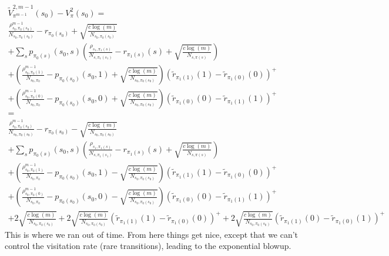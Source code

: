 \documentclass[11pt]{article}
\begin{document}
\begin{gather*}
\tilde{V}^{2, m-1}_{\pi^{m-1}}(s_0)-V_\pi^2(s_0) = \\
\frac{\rho^{m-1}_{s_0, \pi_0(s_0)}}{N_{s_0, \pi_0(s_0)}} - r_{\pi_0(s_0)} + \sqrt{\frac{c \log(m)}{N_{s_0, \pi_0(s_0)}}} \\
+ \sum_s p_{\pi_0(s)}(s_0, s) ( \frac{\rho_{s_1, \pi_1(s)}}{N_{s, \pi_1(s_1)}} - r_{\pi_1(s)}(s)+ \sqrt{\frac{c \log(m)}{N_{s, \pi(s)}}}) \\ 
+ (\frac{\rho^{m-1}_{s_0, \pi_0(1)}}{N_{s_0, \pi_0}} - p_{\pi_0(s_0)}(s_0, 1) + \sqrt{\frac{c \log(m)}{N_{s_0, \pi_0(s_0)}}})(\tilde{r}_{\pi_1(1)}(1) - \tilde{r}_{\pi_1(0)}(0))^+ \\
+ (\frac{\rho^{m-1}_{s_0, \pi_0(0)}}{N_{s_0, \pi_0}} - p_{\pi_0(s_0)}(s_0, 0) + \sqrt{\frac{c \log(m)}{N_{s_0, \pi_0(s_0)}}})(\tilde{r}_{\pi_1(0)}(0) - \tilde{r}_{\pi_1(1)}(1))^+ \\
= \\ 
\frac{\rho^{m-1}_{s_0, \pi_0(s_0)}}{N_{s_0, \pi_0(s_0)}} - r_{\pi_0(s_0)} - \sqrt{\frac{c \log(m)}{N_{s_0, \pi_0(s_0)}}} \\
+ \sum_s p_{\pi_0(s)}(s_0, s) ( \frac{\rho_{s_1, \pi_1(s)}}{N_{s, \pi_1(s_1)}} - r_{\pi_1(s)}(s)+ \sqrt{\frac{c \log(m)}{N_{s, \pi(s)}}}) \\ 
+ (\frac{\rho^{m-1}_{s_0, \pi_0(1)}}{N_{s_0, \pi_0}} - p_{\pi_0(s_0)}(s_0, 1) - \sqrt{\frac{c \log(m)}{N_{s_0, \pi_0(s_0)}}})(\tilde{r}_{\pi_1(1)}(1) - \tilde{r}_{\pi_1(0)}(0))^+ \\
+ (\frac{\rho^{m-1}_{s_0, \pi_0(0)}}{N_{s_0, \pi_0}} - p_{\pi_0(s_0)}(s_0, 0) - \sqrt{\frac{c \log(m)}{N_{s_0, \pi_0(s_0)}}})(\tilde{r}_{\pi_1(0)}(0) - \tilde{r}_{\pi_1(1)}(1))^+ \\
+ 2 \sqrt{\frac{c \log(m)}{N_{s_0, \pi_0(s_0)}}} + 2 \sqrt{\frac{c \log(m)}{N_{s_0, \pi_0(s_0)}}}(\tilde{r}_{\pi_1(1)}(1) - \tilde{r}_{\pi_1(0)}(0))^+ +  2 \sqrt{\frac{c \log(m)}{N_{s_0, \pi_0(s_0)}}}(\tilde{r}_{\pi_1(1)}(0) - \tilde{r}_{\pi_1(0)}(1))^+
\end{gather*}
This is where we ran out of time. From here things get nice, except that we can't control the visitation rate (rare transitions), leading to the exponential blowup.

\end{document}
